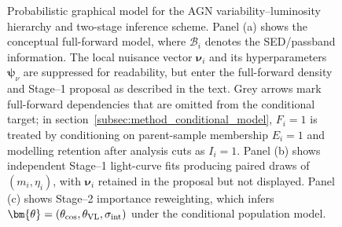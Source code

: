 \begin{figure}[t]
{%
}
\caption{
Probabilistic graphical model for the AGN variability--luminosity hierarchy and two-stage inference scheme. Panel (a) shows the conceptual full-forward model, where \(\mathcal B_i\) denotes the SED/passband information. The local nuisance vector \(\bm{\nu}_i\) and its hyperparameters \(\bm{\psi}_\nu\) are suppressed for readability, but enter the full-forward density and Stage--1 proposal as described in the text. Grey arrows mark full-forward dependencies that are omitted from the conditional target; in section~\ref{subsec:method_conditional_model}, \(F_i=1\) is treated by conditioning on parent-sample membership \(E_i=1\) and modelling retention after analysis cuts as \(I_i=1\). Panel (b) shows independent Stage--1 light-curve fits producing paired draws of \((m_i,\eta_i)\), with \(\bm{\nu}_i\) retained in the proposal but not displayed. Panel (c) shows Stage--2 importance reweighting, which infers \(\bm{\theta}=(\theta_{\rm cos},\theta_{\rm VL},\sigma_{\rm int})\) under the conditional population model.
}
\label{fig:pgm}
\end{figure}

